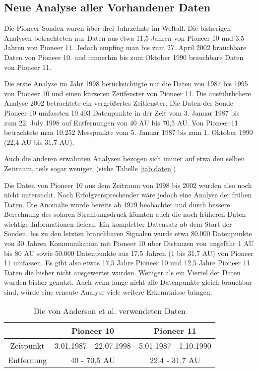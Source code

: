 \subsection{Neue Analyse aller Vorhandener Daten}
Die Pioneer Sonden waren über drei Jahrzehnte im Weltall. Die bisherigen Analysen betrachteten nur Daten aus etwa 11,5 Jahren von Pioneer 10 und 3,5 Jahren von Pioneer 11. Jedoch empfing man bis zum 27. April 2002 brauchbare Daten von Pioneer 10. und immerhin bis zum Oktober 1990 brauchbare Daten von Pioneer 11.

Die erste Analyse im Jahr 1998 berücksichtigte nur die Daten von 1987 bis 1995 von Pioneer 10 und einen kürzeren Zeitfenster von Pioneer 11. Die ausführlichere Analyse 2002 betrachtete ein vergrößertes Zeitfenster. Die Daten der Sonde Pioneer 10 umfassten 19.403 Datenpunkte in der Zeit vom 3. Januar 1987 bis zum 22. July 1998 auf Entfernungen von 40 AU bis 70,5 AU. Von Pioneer 11 betrachtete man 10.252 Messpunkte vom 5. Januar 1987 bis zum 1. Oktober 1990 (22,4 AU bis 31,7 AU).

Auch die anderen erwähnten Analysen bezogen sich immer auf etwa den selben Zeitraum, teils sogar weniger. (siehe Tabelle \ref{tab:daten})

Die Daten von Pioneer 10 aus dem Zeitraum von 1998 bis 2002 wurden also noch nicht untersucht.
Noch Erfolgversprechender wäre jedoch eine Analyse der frühen Daten. Die Anomalie wurde bereits ab 1979 beobachtet und durch bessere Berechnung des solaren Strahlungsdruck könnten auch die noch früheren Daten wichtige Informationen liefern.
Ein kompletter Datensatz ab dem Start der Sonden, bis zu den letzten brauchbaren Signalen würde etwa 80.000 Datenpunkte von 30 Jahren Kommunikation mit Pioneer 10  über Distanzen von ungefähr 1 AU bis 80 AU sowie 50.000 Datenpunkte aus 17.5 Jahren (1 bis 31,7 AU) von Pioneer 11 umfassen.\cite{Turyshev2004} Es gibt also etwas 17,5 Jahre Pioneer 10 und 12,5 Jahre Pioneer 11 Daten die bisher nicht ausgewertet wurden. Weniger als ein Viertel der Daten wurden bisher genutzt. Auch wenn lange nicht alle Datenpunkte gleich brauchbar sind, würde eine erneute Analyse viele weitere Erkenntnisse bringen.

\begin{table}[h]
\centering
\begin{tabular}{|c|c|c|}
\hline & Pioneer 10 & Pioneer 11 \\ 
\hline Zeitpunkt & 3.01.1987 - 22.07.1998  & 5.01.1987 - 1.10.1990 \\ 
\hline Entfernung & 40 - 70,5 AU & 22,4 - 31,7 AU \\ 
\hline 
\end{tabular}
\caption{Die von Anderson et al. verwendeten Daten}
\label{tab:andersondaten}
\end{table}

